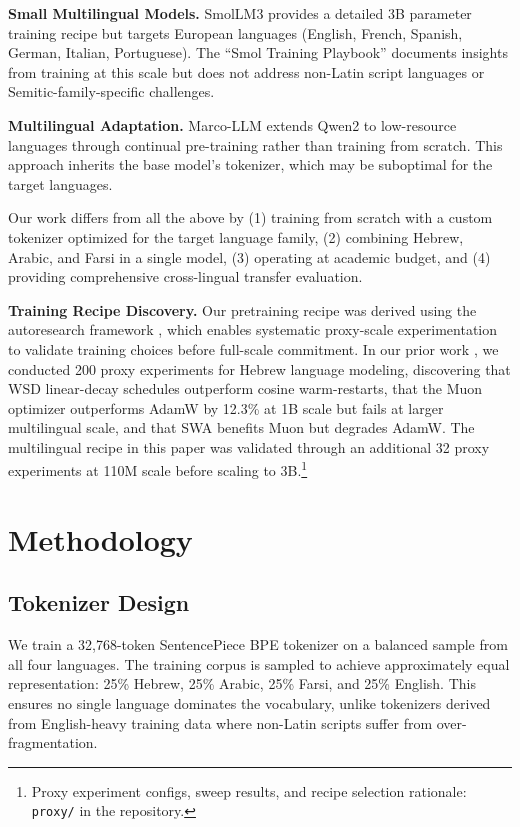 \documentclass[10pt,twocolumn]{article}
\begin{document}
\textbf{Small Multilingual Models.} SmolLM3 \citep{allal2025smollm3} provides a detailed 3B parameter training recipe but targets European languages (English, French, Spanish, German, Italian, Portuguese). The ``Smol Training Playbook'' documents insights from training at this scale but does not address non-Latin script languages or Semitic-family-specific challenges.

\textbf{Multilingual Adaptation.} Marco-LLM \citep{marco2024} extends Qwen2 to low-resource languages through continual pre-training rather than training from scratch. This approach inherits the base model's tokenizer, which may be suboptimal for the target languages.

Our work differs from all the above by (1) training from scratch with a custom tokenizer optimized for the target language family, (2) combining Hebrew, Arabic, and Farsi in a single model, (3) operating at academic budget, and (4) providing comprehensive cross-lingual transfer evaluation.

\textbf{Training Recipe Discovery.}\label{sec:related_recipe} Our pretraining recipe was derived using the autoresearch framework \citep{karpathy2026autoresearch}, which enables systematic proxy-scale experimentation to validate training choices before full-scale commitment. In our prior work \citep{slasky2026hebrew}, we conducted 200 proxy experiments for Hebrew language modeling, discovering that WSD linear-decay schedules outperform cosine warm-restarts, that the Muon optimizer outperforms AdamW by 12.3\% at 1B scale but fails at larger multilingual scale, and that SWA benefits Muon but degrades AdamW. The multilingual recipe in this paper was validated through an additional 32 proxy experiments at 110M scale before scaling to 3B.\footnote{Proxy experiment configs, sweep results, and recipe selection rationale: \texttt{proxy/} in the repository.}

\section{Methodology}

\subsection{Tokenizer Design}

We train a 32,768-token SentencePiece BPE tokenizer on a balanced sample from all four languages. The training corpus is sampled to achieve approximately equal representation: 25\% Hebrew, 25\% Arabic, 25\% Farsi, and 25\% English. This ensures no single language dominates the vocabulary, unlike tokenizers derived from English-heavy training data where non-Latin scripts suffer from over-fragmentation.
\end{document}
